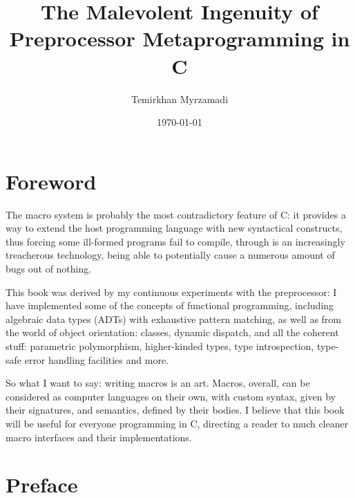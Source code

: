\documentclass[a4paper, 12pt]{book}
\begin{document}
\title{The Malevolent Ingenuity of Preprocessor Metaprogramming in C}
\author{Temirkhan Myrzamadi}
\date{\today}
\maketitle

\tableofcontents

\newpage

\section{Foreword}

The macro system is probably the most contradictory feature of C: it provides a way to extend
the host programming language with new syntactical constructs, thus forcing some ill-formed programs
fail to compile, through is an increasingly treacherous technology, being able to potentially
cause a numerous amount of bugs out of nothing.

This book was derived by my continuous experiments with the preprocessor: I have implemented some of
the concepts of functional programming, including algebraic data types (ADTs) with exhaustive
pattern matching, as well as from the world of object orientation: classes, dynamic dispatch, and
all the coherent stuff: parametric polymorphism, higher-kinded types, type introspection, type-safe
error handling facilities and more.

So what I want to say: writing macros is an art. Macros, overall, can be considered as computer
languages on their own, with custom syntax, given by their signatures, and semantics, defined by
their bodies. I believe that this book will be useful for everyone programming in C, directing a
reader to much cleaner macro interfaces and their implementations.

\newpage

\section{Preface}
\end{document}

